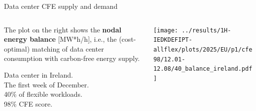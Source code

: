 \begin{frame}{Data center CFE supply and demand}
  \label{nbtemp-40-IE}

  {\footnotesize
  
  \begin{columns}[T]
    \begin{column}{3.5cm}
      \vspace{0.3cm}
      The plot on the right shows the {\bf nodal energy balance} [MW*h/h], i.e., the (cost-optimal) matching of data center consumption with carbon-free energy supply.

      \vspace{0.2cm}
      Data center in Ireland. \\
      The first week of December. \\
      40\% of flexible workloads.\\
      98\% CFE score.\\

    \end{column}
  
    \begin{column}{11cm}
      \texttt{[image: ../results/1H-IEDKDEFIPT-allflex/plots/2025/EU/p1/cfe98/12.01-12.08/40\_balance\_ireland.pdf]}
    \end{column}
    \end{columns}
    } 

\end{frame}




